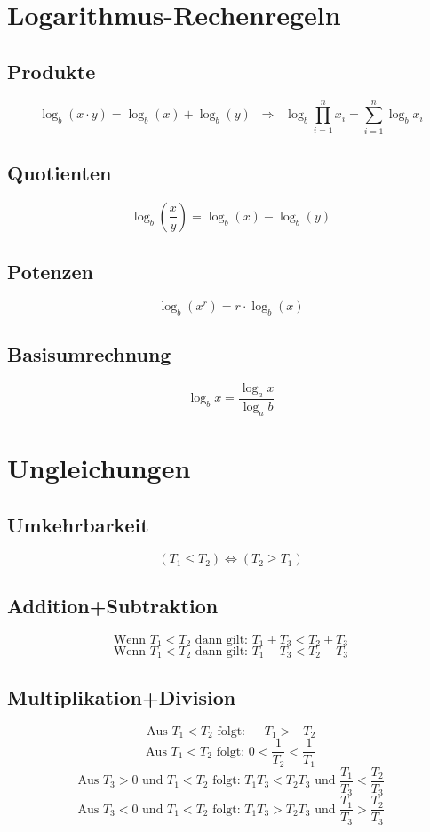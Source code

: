 \section{Logarithmus-Rechenregeln}\label{sec:logarithmus}
\subsection{Produkte}\label{sec:logarithmus_produkte}
\[\log_b(x\cdot y)=\log_b(x)+\log_b(y)\;\;\Rightarrow\;\;\log _{b}\prod _{{i=1}}^{n}x_{i}=\sum _{{i=1}}^{n}\log _{b}x_{i}\]

\subsection{Quotienten}
\[\log_b\left(\frac{x}{y}\right)=\log_b(x)-\log_b(y)\]

\subsection{Potenzen}
\[\log_b \left(x^r\right)=r\cdot \log_b(x)\]

\subsection{Basisumrechnung}
\[\log_b x=\frac{\log_a x}{\log_a b}\]

\section{Ungleichungen}
\subsection{Umkehrbarkeit}
\[({T_{1}}\leq {}{T_{2}})\Leftrightarrow ({T_{2}}\geq {}{T_{1}})\]

\subsection{Addition+Subtraktion}
\[\text{Wenn }T_1<T_2\text{ dann gilt: }T_{1}+T_{3}<T_{2}+T_{3}\]
\[\text{Wenn }T_1<T_2\text{ dann gilt: }T_{1}-T_{3}<T_{2}-T_{3}\]

\subsection{Multiplikation+Division}
\[\text{Aus }T_1<T_2\text{ folgt: }-T_1>-T_2\]
\[\text{Aus }T_1<T_2\text{ folgt: }0<\frac{1}{T_2}<\frac{1}{T_1}\]
\[\text{Aus }T_3>0 \text{ und }T_1<T_2\text{ folgt: }T_1T_3<T_2T_3 \text{ und }\frac{T_1}{T_3}<\frac{T_2}{T_3}\]
\[\text{Aus }T_3<0 \text{ und }T_1<T_2\text{ folgt: }T_1T_3>T_2T_3 \text{ und }\frac{T_1}{T_3}>\frac{T_2}{T_3}\]

